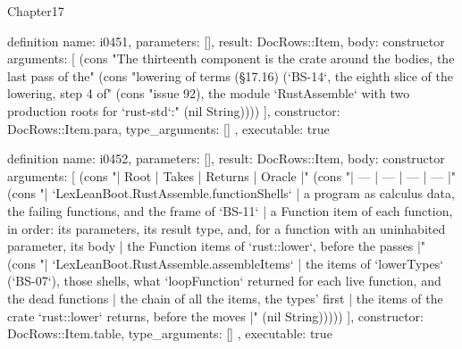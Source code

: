 \begin{lexlean}{Chapter17}
\begin{semanticmodule}
definition{
  name: i0451,
  parameters: [],
  result: DocRows::Item,
  body: constructor{
    arguments: [
      (cons "The thirteenth component is the crate around the bodies, the last pass of the" (cons "lowering of terms (§17.16) (`BS-14`, the eighth slice of the lowering, step 4 of" (cons "issue 92), the module `RustAssemble` with two production roots for `rust-std`:" (nil String))))
    ],
    constructor: DocRows::Item.para,
    type_arguments: []
  },
  executable: true
}

definition{
  name: i0452,
  parameters: [],
  result: DocRows::Item,
  body: constructor{
    arguments: [
      (cons "| Root | Takes | Returns | Oracle |" (cons "| --- | --- | --- | --- |" (cons "| `LexLeanBoot.RustAssemble.functionShells` | a program as calculus data, the failing functions, and the frame of `BS-11` | a Function item of each function, in order: its parameters, its result type, and, for a function with an uninhabited parameter, its body | the Function items of `rust::lower`, before the passes |" (cons "| `LexLeanBoot.RustAssemble.assembleItems` | the items of `lowerTypes` (`BS-07`), those shells, what `loopFunction` returned for each live function, and the dead functions | the chain of all the items, the types' first | the items of the crate `rust::lower` returns, before the moves |" (nil String)))))
    ],
    constructor: DocRows::Item.table,
    type_arguments: []
  },
  executable: true
}


\end{semanticmodule}
\end{lexlean}
